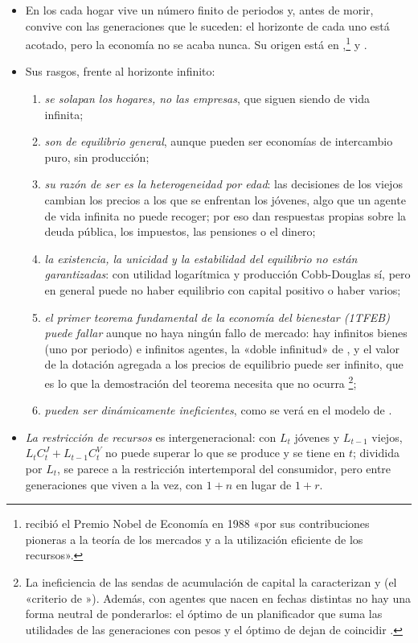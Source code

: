 \documentclass[11pt]{article}
\begin{document}
\begin{itemize}
\item En los  cada hogar vive un número finito de periodos y, antes de morir, convive con las generaciones que le suceden: el horizonte de cada uno está acotado, pero la economía no se acaba nunca. Su origen está en \textcite{Allais1947Economie},\footnote{ recibió el Premio Nobel de Economía en 1988 «por sus contribuciones pioneras a la teoría de los mercados y a la utilización eficiente de los recursos»\nocite{Nobel1988Allais}.} \textcite{Samuelson1958Exact} y \textcite{Diamond1965National}.
\item Sus rasgos, frente al horizonte infinito:
  \begin{enumerate}
  \item \emph{se solapan los hogares, no las empresas}, que siguen siendo de vida infinita;
  \item \emph{son de equilibrio general}, aunque pueden ser economías de intercambio puro, sin producción;
  \item \emph{su razón de ser es la heterogeneidad por edad}: las decisiones de los viejos cambian los precios a los que se enfrentan los jóvenes, algo que un agente de vida infinita no puede recoger; por eso dan respuestas propias sobre la deuda pública, los impuestos, las pensiones o el dinero;
  \item \emph{la existencia, la unicidad y la estabilidad del equilibrio no están garantizadas}: con utilidad logarítmica y producción Cobb-Douglas sí, pero en general puede no haber equilibrio con capital positivo o haber varios\nocite{GalorRyder1989Existence};
  \item \emph{el primer teorema fundamental de la economía del bienestar (1TFEB) puede fallar} aunque no haya ningún fallo de mercado: hay infinitos bienes (uno por periodo) e infinitos agentes, la «doble infinitud» de \textcite{Shell1971Notes}, y el valor de la dotación agregada a los precios de equilibrio puede ser infinito, que es lo que la demostración del teorema necesita que no ocurra \footnote{La ineficiencia de las sendas de acumulación de capital la caracterizan \textcite{Malinvaud1953Capital} y \textcite{Cass1972Capital} (el «criterio de »). Además, con agentes que nacen en fechas distintas no hay una forma neutral de ponderarlos: el óptimo de un planificador que suma las utilidades de las generaciones con pesos y el óptimo de  dejan de coincidir .};
  \item \emph{pueden ser dinámicamente ineficientes}, como se verá en el modelo de .
  \end{enumerate}
\item \emph{La restricción de recursos} es intergeneracional: con $L_t$ jóvenes y $L_{t-1}$ viejos, $L_tC^J_t+L_{t-1}C^V_t$ no puede superar lo que se produce y se tiene en $t$; dividida por $L_t$, se parece a la restricción intertemporal del consumidor, pero entre generaciones que viven a la vez, con $1+n$ en lugar de $1+r$.
\end{itemize}
\end{document}
